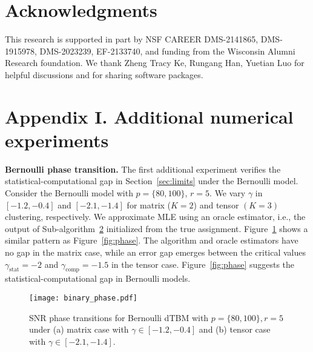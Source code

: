 \documentclass[lettersize,onecolumn,journal]{IEEEtran}
\theoremstyle{definition}
\theoremstyle{definition}
\begin{document}
\section*{Acknowledgments}
This research is supported in part by NSF CAREER DMS-2141865, DMS-1915978, DMS-2023239, EF-2133740, and funding from the Wisconsin Alumni Research foundation. We thank Zheng Tracy Ke, Rungang Han, Yuetian Luo for helpful discussions and for sharing software packages. 






\newpage
\appendix

{\color{blue}
\section*{Appendix I. Additional numerical experiments}
\textbf{Bernoulli phase transition.} The first additional experiment verifies the statistical-computational gap in Section~\ref{sec:limits} under the Bernoulli model. Consider the Bernoulli model with $p = \{80, 100\}$, $r = 5$. We vary $\gamma $ in $ [-1.2, -0.4]$ and $[-2.1, -1.4]$ for matrix ($K=2$) and tensor $(K = 3)$ clustering, respectively. We  approximate MLE using an oracle estimator, i.e., the output of Sub-algorithm~\hyperref[alg:main]{2} initialized from the true assignment. Figure~\ref{fig:phase_binary} shows a similar pattern as Figure~\ref{fig:phase}. The algorithm and oracle estimators have no gap in the matrix case, while an error gap emerges between the critical values $\gamma_{\text{stat}} = -2$ and $\gamma_{\text{comp}} = -1.5$ in the tensor case. Figure~\ref{fig:phase} suggests the statistical-computational gap in Bernoulli models.

\begin{figure}[htb]
    \centering
    \texttt{[image: binary\_phase.pdf]}
    \caption{SNR phase transitions for Bernoulli dTBM with $p = \{80, 100\}, r = 5$ under (a) matrix case with $\gamma \in [-1.2, -0.4]$ and (b) tensor case with $ \gamma \in [-2.1, -1.4]$.}
    \label{fig:phase_binary}
\end{figure}

}
\end{document}
